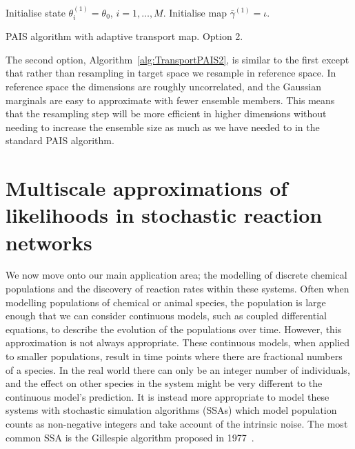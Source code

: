 \documentclass[final]{siamltex}
\begin{document}
\begin{table}
\begin{algorithm}[H]
\DontPrintSemicolon
\BlankLine
Initialise state $\theta^{(1)}_i = \theta_0$, \quad $i = 1,\dots,M$.\;
Initialise map $\bar{\gamma}^{(1)} = \iota$.\;
\caption{PAIS algorithm with adaptive transport map. Option 2.\label{alg:TransportPAIS2}}
\end{algorithm}
\end{table}

The second option, Algorithm~\ref{alg:TransportPAIS2}, is similar to the first except that rather than resampling in target space we resample in reference space. In reference space the dimensions are roughly uncorrelated, and the Gaussian marginals are easy to approximate with fewer ensemble members. This means that the resampling step will be more efficient in higher dimensions without needing to increase the ensemble size as much as we have needed to in the standard PAIS algorithm.

\section{Multiscale approximations of likelihoods in stochastic
  reaction networks}\label{sec:multi}

We now move onto our main application area; the modelling of discrete chemical populations and the discovery of reaction rates within these systems. Often when modelling populations of chemical or animal species, the population is large enough that we can consider continuous models, such as coupled differential equations, to describe the evolution of the populations over time. However, this approximation is not always appropriate. These continuous models, when applied to smaller populations, result in time points where there are fractional numbers of a species. In the real world there can only be an integer number of individuals, and the effect on other species in the system might be very different to the continuous model's prediction. It is instead more appropriate to model these systems with stochastic simulation algorithms (SSAs) which model population counts as non-negative integers and take account of the intrinsic noise. The most common SSA is the Gillespie algorithm proposed in 1977~\cite{gillespie1977exact}.
\end{document}
